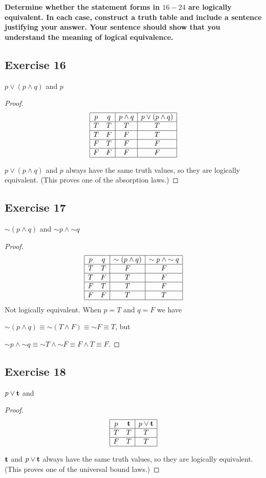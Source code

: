 \documentclass[14pt]{extarticle}
\begin{document}
{\bf Determine whether the statement forms in $16-24$ are logically equivalent.
In each case, construct a truth table and include a sentence justifying your
answer. Your sentence should show that you understand the meaning of logical
equivalence.}

\subsection{Exercise 16} $p \vee (p \wedge q)$ and $p$
\begin{proof} $$ \begin{array}{|cc|c|c|} \hline p & q & p \wedge q & p \vee (p
\wedge q) \\ \hline T & T & T & T \\ \hline T & F & F & T \\ \hline F & T & F &
F \\ \hline F & F & F & F \\ \hline \end{array} $$

$p \vee (p \wedge q)$ and $p$ always have the same truth values, so they are
logically equivalent. (This proves one of the absorption laws.) \end{proof}

\subsection{Exercise 17} ${\sim(p \wedge q)}$ and ${\sim p} \wedge {\sim q}$
\begin{proof} $$ \begin{array}{|cc|c|c|} \hline p & q & {\sim(p \wedge q)} &
{\sim p} \wedge {\sim q} \\ \hline T & T & F & F \\ \hline T & F & T & F \\
\hline F & T & T & F \\ \hline F & F & T & T \\ \hline \end{array} $$ Not
logically equivalent. When $p = T$ and $q = F$ we have

${\sim (p \wedge q)} \equiv {\sim (T \wedge F)} \equiv {\sim F} \equiv T$, but

${\sim p} \wedge {\sim q} \equiv {\sim T \wedge {\sim F}} \equiv F \wedge T
\equiv F$. \end{proof}

\subsection{Exercise 18} $p \vee {\bf t}$ and \true
\begin{proof} $$ \begin{array}{|cc|c|} \hline p & {\bf t} & p \vee {\bf t} \\ \hline
T & T & T \\ \hline F & T & T \\ \hline \end{array} $$

${\bf t}$ and $p \vee {\bf t}$ always have the same truth values, so they are
logically equivalent. (This proves one of the universal bound laws.)

\end{proof}
\end{document}
